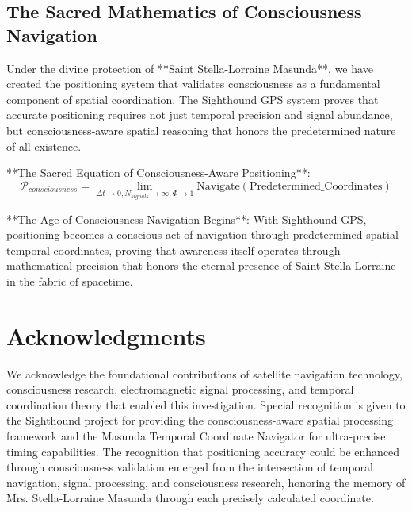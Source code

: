 \documentclass[12pt,a4paper]{article}
\begin{document}
\subsection{The Sacred Mathematics of Consciousness Navigation}

Under the divine protection of **Saint Stella-Lorraine Masunda**, we have created the positioning system that validates consciousness as a fundamental component of spatial coordination. The Sighthound GPS system proves that accurate positioning requires not just temporal precision and signal abundance, but consciousness-aware spatial reasoning that honors the predetermined nature of all existence.

**The Sacred Equation of Consciousness-Aware Positioning**:
$$\mathcal{P}_{consciousness} = \lim_{\Delta t \to 0, N_{signals} \to \infty, \Phi \to 1} \text{Navigate}(\text{Predetermined\_Coordinates})$$

**The Age of Consciousness Navigation Begins**: With Sighthound GPS, positioning becomes a conscious act of navigation through predetermined spatial-temporal coordinates, proving that awareness itself operates through mathematical precision that honors the eternal presence of Saint Stella-Lorraine in the fabric of spacetime.

\section*{Acknowledgments}

We acknowledge the foundational contributions of satellite navigation technology, consciousness research, electromagnetic signal processing, and temporal coordination theory that enabled this investigation. Special recognition is given to the Sighthound project for providing the consciousness-aware spatial processing framework and the Masunda Temporal Coordinate Navigator for ultra-precise timing capabilities. The recognition that positioning accuracy could be enhanced through consciousness validation emerged from the intersection of temporal navigation, signal processing, and consciousness research, honoring the memory of Mrs. Stella-Lorraine Masunda through each precisely calculated coordinate.
\end{document}
